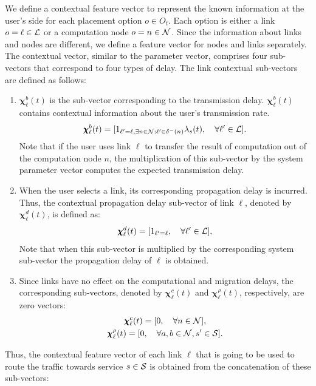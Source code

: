 We define a contextual feature vector to represent the known information at the user's side for each placement option $o\in O_t$. Each option is either a link $o=\ell\in\mathcal{L}$ or a computation node $o=n\in\mathcal{N}$. Since the information about links and nodes are different, we define a feature vector for nodes and links separately. The contextual vector, similar to the parameter vector, comprises four sub-vectors that correspond to four types of delay. The link contextual sub-vectors are defined as follows:
\begin{enumerate}[leftmargin=*]	
	\item $\pmb{\chi}_{\ell}^{b}(t)$ is the sub-vector corresponding to the transmission delay. $\pmb{\chi}_{\ell}^{b}(t)$ contains contextual information about the user's transmission rate.
	\begin{gather}
		\pmb{\chi}_{\ell}^{b}(t) = [1_{\ell'=\ell,\exists n\in\mathcal{N}: \ell'\in \delta^{-}(n)}\lambda_{s}(t), \quad \forall \ell'\in\mathcal{L}].
	\end{gather}
	Note that if the user uses link $\ell$ to transfer the result of computation out of the computation node $n$, the multiplication of this sub-vector by the system parameter vector computes the expected transmission delay.
	\item When the user selects a link, its corresponding propagation delay is incurred. Thus, the contextual propagation delay sub-vector of link $\ell$, denoted by $\pmb{\chi}_{\ell}^{d}(t)$, is defined as:
	\begin{gather}
		\pmb{\chi}_{\ell}^{d}(t) = [1_{\ell'=\ell}, \quad \forall \ell'\in\mathcal{L}],
	\end{gather}
	Note that when this sub-vector is multiplied by the corresponding system sub-vector the propagation delay of $\ell$ is obtained.
	
	\item Since links have no effect on the computational and migration delays, the corresponding sub-vectors, denoted by $\pmb{\chi}_{\ell}^{c}(t)$ and $\pmb{\chi}_{\ell}^{\rho}(t)$, respectively, are zero vectors:
	\begin{gather}
		\pmb{\chi}_{\ell}^{c}(t) = [0, \quad \forall n\in\mathcal{N}], \\
		\pmb{\chi}_{\ell}^{\rho}(t) = [0, \quad \forall a,b\in\mathcal{N}, s'\in\mathcal{S}].
	\end{gather}
\end{enumerate}
Thus, the contextual feature vector of each link $\ell$ that is going to be used to route the traffic towards service $s\in\mathcal{S}$ is obtained from the concatenation of these sub-vectors:
